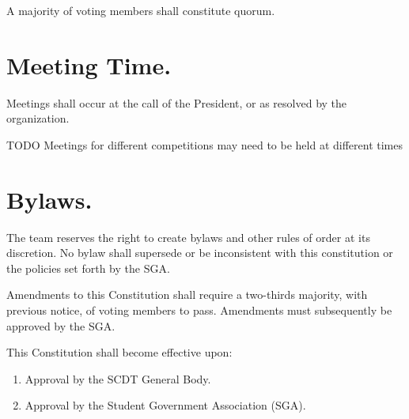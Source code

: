 \documentclass[12pt]{constitution}
\begin{document}
A majority of voting members shall constitute quorum.

\section{Meeting Time.}\label{sec:MEETING-TIME}

Meetings shall occur at the call of the President, or as resolved by the
organization.

TODO Meetings for different competitions may need to be held at different times

\section{Bylaws.}\label{sec:BYLAWS}

The team reserves the right to create bylaws and other rules of order at its
discretion. No bylaw shall supersede or be inconsistent with this constitution
or the policies set forth by the SGA.

\label{art:AMENDMENTS}

Amendments to this Constitution shall require a two-thirds majority, with
previous notice, of voting members to pass. Amendments must subsequently be
approved by the SGA. 

\label{art:ADOPTION}

This Constitution shall become effective upon: 

\begin{enumerate}
    \item Approval by the SCDT General Body.
    \item Approval by the Student Government Association (SGA). 
\end{enumerate}
\end{document}
